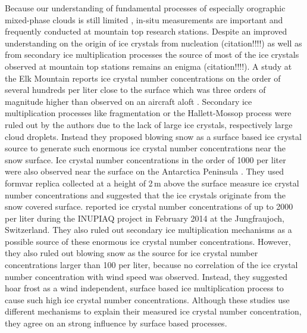 \documentclass[draft,linenumbers]{agujournal}
\begin{document}
Because our understanding of fundamental processes of especially orographic mixed-phase clouds is still limited \citep{Bau10}, in-situ measurements are important and frequently conducted at mountain top research stations. Despite an improved understanding on the origin of ice crystals from nucleation (citation!!!!) as well as from secondary ice multiplication processes \citep{Fie17} the source of most of the ice crystals observed at mountain top stations remains an enigma (citation!!!!). A study at the Elk Mountain reports ice crystal number concentrations on the order of several hundreds per liter close to the surface which was three orders of magnitude higher than observed on an aircraft aloft \citep{Rog87}. Secondary ice multiplication processes like fragmentation \citep{Ran01} or the Hallett-Mossop process \citep{Hal74} were ruled out by the authors due to the lack of large ice crystals, respectively large cloud droplets. Instead they proposed blowing snow as a surface based ice crystal source to generate such enormous ice crystal number concentrations near the snow surface. Ice crystal number concentrations in the order of 1000 per liter were also observed near the surface on the Antarctica Peninsula \citep{Lac01}. They used formvar replica collected at a height of 2\,\si{m} above the surface measure ice crystal number concentrations and suggested that the ice crystals originate from the snow covered surface. \citet{Loy15} reported ice crystal number concentrations of up to 2000 per liter during the INUPIAQ project in February 2014 at the Jungfraujoch, Switzerland. They also ruled out secondary ice multiplication mechanisms as a possible source of these enormous ice crystal number concentrations. However, they also ruled out blowing snow as the source for ice crystal number concentrations larger than 100 per liter, because no correlation of the ice crystal number concentration with wind speed was observed. Instead, they suggested hoar frost as a wind independent, surface based ice multiplication process to cause such high ice crystal number concentrations. Although these studies use different mechanisms to explain their measured ice crystal number concentration, they agree on an strong influence by surface based processes. 
\end{document}
